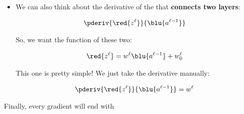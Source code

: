         \begin{itemize}
            
            \item We can also think about the derivative of the  that \textbf{connects two layers}:
            
                \begin{equation}
                    \pderiv {\red{z^\ell}}   {\blu{a^{\ell-1}}}
                \end{equation}
                
                So, we want the function of these two:
                
                \begin{equation}
                    \red{z^\ell} = w^\ell \blu{ a^{\ell-1} } + w_0^\ell
                \end{equation}
                
                This one is pretty simple! We just take the derivative manually:
                
                \begin{equation}
                    \pderiv {\red{z^\ell}}   {\blu{a^{\ell-1}}}
                    =
                    w^{\ell}
                \end{equation}
                
        \end{itemize}
        
    Finally, every gradient will end with
        
